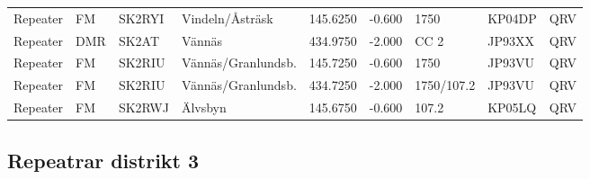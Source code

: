\begin{landscape}
\begin{longtable}{llllrrlll}
Repeater   & FM          & SK2RYI    & Vindeln/Åsträsk    & 145.6250     & -0.600     & 1750       & KP04DP      & QRV      \\
Repeater   & DMR         & SK2AT     & Vännäs             & 434.9750     & -2.000     & CC 2       & JP93XX      & QRV      \\
Repeater   & FM          & SK2RIU    & Vännäs/Granlundsb. & 145.7250     & -0.600     & 1750       & JP93VU      & QRV      \\
Repeater   & FM          & SK2RIU    & Vännäs/Granlundsb. & 434.7250     & -2.000     & 1750/107.2 & JP93VU      & QRV      \\
Repeater   & FM          & SK2RWJ    & Älvsbyn            & 145.6750     & -0.600     & 107.2      & KP05LQ      & QRV      \\
\end{longtable}



\clearpage

\subsection{Repeatrar distrikt 3}




\end{landscape}
